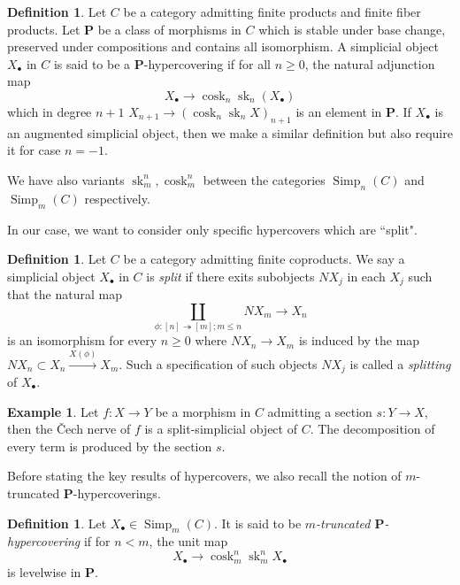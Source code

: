 \documentclass[a4paper]{amsart}
\theoremstyle{definition}
\newtheorem{definition}[theorem]{Definition}
\newtheorem{example}[theorem]{Example}
\begin{document}
\begin{definition}\cite[Definition 4.1]{conradcohmdescent}
    Let $C$ be a category admitting finite products and finite fiber products. Let $\mathbf{P}$ be a class of morphisms in $C$ which is stable under base change, preserved under compositions and contains all isomorphism. A simplicial object $X_{\bullet}$ in $C$ is said to be a $\mathbf{P}$-hypercovering if  for all $n \ge 0$, the natural adjunction map 
    \begin{equation}
        X_{\bullet} \to \operatorname{cosk}_n\operatorname{sk}_n(X_{\bullet})
    \end{equation}
    which in degree $n+1$ $X_{n+1} \to (\operatorname{cosk}_n\operatorname{sk}_n X)_{n+1}$ is an element in $\mathbf{P}$. If $X_{\bullet}$ is an augmented simplicial object, then we make a similar definition but also require it for case $n =-1$.
\end{definition}

We have also variants $\operatorname{sk}^n_m, \operatorname{cosk}^n_m$ between the categories $\operatorname{Simp}_n(C)$ and $\operatorname{Simp}_m(C)$ respectively.

In our case, we want to consider only specific hypercovers which are ``split". 
\begin{definition}
    Let $C$ be a category admitting finite coproducts. We say a simplicial object $X_{\bullet}$ in $C$ is \textit{split} if there exits subobjects $NX_j$ in each $X_j$ such that the natural map 
    \begin{equation}
        \coprod_{\phi : [n] \twoheadrightarrow [m]; m \le n}NX_m \to X_n
    \end{equation}
    is an isomorphism for every $n \ge 0$ where $NX_n \to X_m$ is induced by the map $NX_n \subset X_n \xrightarrow{X(\phi)}X_m$. Such a specification of such objects $NX_j$ is called a \textit{splitting} of $X_{\bullet}$.
\end{definition}
\begin{example}
    Let $f: X \to Y$ be a morphism in $C$ admitting a section $s: Y \to X$, then the \v{C}ech nerve of $f$ is a split-simplicial object of $C$. The decomposition of every term is produced by the section $s$. 
\end{example}
Before stating the key results of hypercovers, we also recall the notion of $m$-truncated $\mathbf{P}$-hypercoverings.
\begin{definition}\cite[Example 4.5]{conradcohmdescent}
    Let $X_{\bullet} \in \operatorname{Simp}_m(C)$. It is said to be  \textit{$m$-truncated $\mathbf{P}$-hypercovering} if for $n <m$, the unit map 
    \begin{equation}
        X_{\bullet} \to \operatorname{cosk}^n_m\operatorname{sk}^n_mX_{\bullet}
    \end{equation}
    is levelwise in $\mathbf{P}$.\end{definition}
\end{document}

